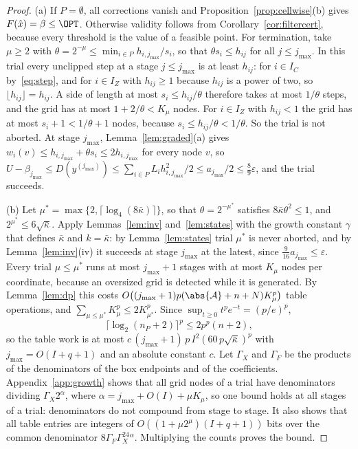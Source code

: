 \begin{proof}
(a) If $P=\emptyset$, all corrections vanish and
Proposition~\ref{prop:cellwise}(b) gives $F(\hat x)=\beta\le\OPT$. Otherwise
validity follows from Corollary~\ref{cor:filtercert}, because every threshold
is the value of a feasible point. For termination, take $\mu\ge2$ with
$\theta=2^{-\mu}\le\min_{i\in P}h_{i,j_{\max}}/s_i$, so that
$\theta s_i\le h_{ij}$ for all $j\le j_{\max}$. In this trial every unclipped
step at a stage $j\le j_{\max}$ is at least $h_{ij}$: for $i\in I_C$
by~\eqref{eq:step}, and for $i\in I_Z$ with
$h_{ij}\ge1$ because $h_{ij}$ is a power of two, so
$\lfloor h_{ij}\rfloor=h_{ij}$. A side of length at most $s_i\le h_{ij}/\theta$
therefore takes at most $1/\theta$ steps, and the grid has at most
$1+2/\theta<K_\mu$ nodes. For $i\in I_Z$ with $h_{ij}<1$ the grid has at most
$s_i+1<1/\theta+1$ nodes, because $s_i\le h_{ij}/\theta<1/\theta$. So the
trial is not aborted. At stage $j_{\max}$, Lemma~\ref{lem:graded}(a) gives
$w_i(v)\le h_{i,j_{\max}}+\theta s_i\le2h_{i,j_{\max}}$ for every node $v$, so
$U-\beta_{j_{\max}}\le D(y^{(j_{\max})})\le\sum_{i\in P}L_ih_{i,j_{\max}}^2/2
\le a_{j_{\max}}/2\le\frac89\varepsilon$, and the trial succeeds.

(b) Let $\mu^*=\max\{2,\lceil\log_4(8\bar\kappa)\rceil\}$, so that
$\theta=2^{-\mu^*}$ satisfies $8\bar\kappa\theta^2\le1$, and
$2^{\mu^*}\le6\sqrt{\bar\kappa}$. Apply Lemmas~\ref{lem:inv}
and~\ref{lem:states} with the growth constant $\gamma$ that defines
$\bar\kappa$ and $k=\bar\kappa$: by Lemma~\ref{lem:states} trial $\mu^*$ is
never aborted, and by Lemma~\ref{lem:inv}(iv) it succeeds at stage
$j_{\max}$ at the latest, since $\frac9{16}a_{j_{\max}}\le\varepsilon$. Every
trial $\mu\le\mu^*$ runs at most $j_{\max}+1$ stages with at most $K_\mu$
nodes per coordinate, because an oversized grid is detected while it is
generated. By Lemma~\ref{lem:dp} this costs
$O\bigl((j_{\max}+1)p(\abs{\mathcal A}+n+N)K_\mu^p\bigr)$ table operations,
and $\sum_{\mu\le\mu^*}K_\mu^p\le2K_{\mu^*}^p$. Since
$\sup_{t\ge0}t^pe^{-t}=(p/e)^p$,
\begin{equation}\label{eq:logabsorb}
\lceil\log_2(n_P+2)\rceil^p\le2p^p(n+2),
\end{equation}
so the table work is at most
$c\,(j_{\max}+1)\,p\,I^2(60\,p\sqrt{\bar\kappa})^p$ with
$j_{\max}=O(I+q+1)$ and an absolute constant $c$.
Let $\Gamma_X$ and $\Gamma_F$ be the products of the denominators of the box
endpoints and of the coefficients. Appendix~\ref{app:growth} shows that all
grid nodes of a trial have denominators dividing $\Gamma_X2^\alpha$, where
$\alpha=j_{\max}+O(I)+\mu K_\mu$, so one bound holds at all stages of a
trial: denominators do not compound from stage to stage. It also shows that
all table entries are integers of $O((1+\mu2^\mu)(I+q+1))$ bits over the
common denominator $8\Gamma_F\Gamma_X^24^\alpha$. Multiplying the counts
proves the bound.
\end{proof}


